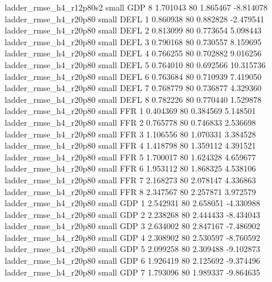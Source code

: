  ladder_rmse_h4_r12p80s2      small      GDP                 8 1.701043 80       1.865467          -8.814078
   ladder_rmse_h4_r20p80      small     DEFL                 1 0.860938 80       0.882828          -2.479541
   ladder_rmse_h4_r20p80      small     DEFL                 2 0.813099 80       0.773654           5.098443
   ladder_rmse_h4_r20p80      small     DEFL                 3 0.790168 80       0.730557           8.159695
   ladder_rmse_h4_r20p80      small     DEFL                 4 0.766255 80       0.702882           9.016256
   ladder_rmse_h4_r20p80      small     DEFL                 5 0.764010 80       0.692566          10.315736
   ladder_rmse_h4_r20p80      small     DEFL                 6 0.763684 80       0.710939           7.419050
   ladder_rmse_h4_r20p80      small     DEFL                 7 0.768779 80       0.736877           4.329360
   ladder_rmse_h4_r20p80      small     DEFL                 8 0.782226 80       0.770440           1.529878
   ladder_rmse_h4_r20p80      small      FFR                 1 0.404369 80       0.384569           5.148501
   ladder_rmse_h4_r20p80      small      FFR                 2 0.765778 80       0.746833           2.536698
   ladder_rmse_h4_r20p80      small      FFR                 3 1.106556 80       1.070331           3.384528
   ladder_rmse_h4_r20p80      small      FFR                 4 1.418798 80       1.359112           4.391521
   ladder_rmse_h4_r20p80      small      FFR                 5 1.700017 80       1.624328           4.659677
   ladder_rmse_h4_r20p80      small      FFR                 6 1.953112 80       1.868325           4.538106
   ladder_rmse_h4_r20p80      small      FFR                 7 2.168273 80       2.078147           4.336863
   ladder_rmse_h4_r20p80      small      FFR                 8 2.347567 80       2.257871           3.972579
   ladder_rmse_h4_r20p80      small      GDP                 1 2.542931 80       2.658051          -4.330988
   ladder_rmse_h4_r20p80      small      GDP                 2 2.238268 80       2.444433          -8.434043
   ladder_rmse_h4_r20p80      small      GDP                 3 2.634002 80       2.847167          -7.486902
   ladder_rmse_h4_r20p80      small      GDP                 4 2.308902 80       2.530597          -8.760592
   ladder_rmse_h4_r20p80      small      GDP                 5 2.099258 80       2.309488          -9.102873
   ladder_rmse_h4_r20p80      small      GDP                 6 1.926419 80       2.125692          -9.374496
   ladder_rmse_h4_r20p80      small      GDP                 7 1.793096 80       1.989337          -9.864635
